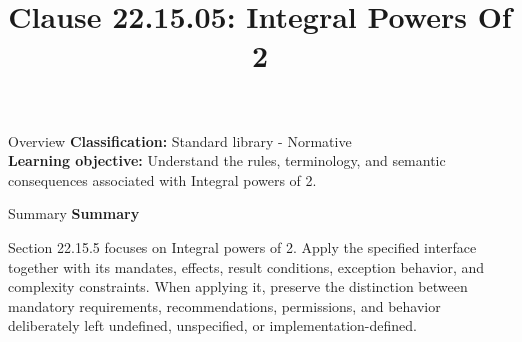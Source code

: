 \documentclass[10pt,letterpaper]{article}
\title{Clause 22.15.05: Integral Powers Of 2}
\author{}
\date{}
\begin{document}
\maketitle
\begin{CornellOverviewBox}{Overview}
\textbf{Classification:} Standard library - Normative\\[2pt]
\textbf{Learning objective:} Understand the rules, terminology, and semantic consequences associated with Integral powers of 2.
\end{CornellOverviewBox}\begin{CornellSummaryBox}{Summary}
{\sffamily\bfseries\color{Accent} Summary}\par\vspace{3pt}Section 22.15.5 focuses on Integral powers of 2. Apply the specified interface together with its mandates, effects, result conditions, exception behavior, and complexity constraints. When applying it, preserve the distinction between mandatory requirements, recommendations, permissions, and behavior deliberately left undefined, unspecified, or implementation-defined.
\end{CornellSummaryBox}
\end{document}
